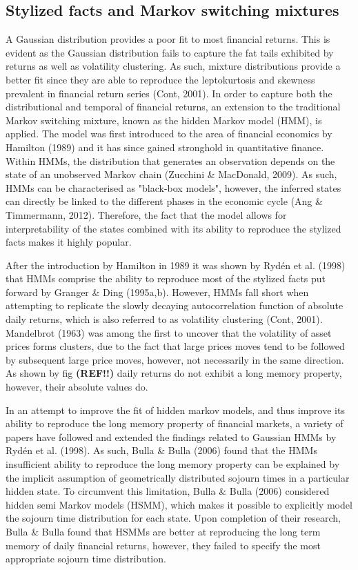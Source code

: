 \subsection*{Stylized facts and Markov switching mixtures}
A Gaussian distribution provides a poor fit to most financial returns. This is evident as the Gaussian distribution fails to capture the fat tails exhibited by returns as well as volatility clustering. As such, mixture distributions provide a better fit since they are able to reproduce the leptokurtosis and skewness prevalent in financial return series (Cont, 2001). In order to capture both the distributional and temporal of financial returns, an extension to the traditional Markov switching mixture, known as the hidden Markov model (HMM), is applied. The model was first introduced to the area of financial economics by Hamilton (1989) and it has since gained stronghold in quantitative finance. Within HMMs, the distribution that generates an observation depends on the state of an unobserved Markov chain (Zucchini \& MacDonald, 2009). As such, HMMs can be characterised as "black-box models", however, the inferred states can directly be linked to the different phases in the economic cycle (Ang \& Timmermann, 2012). Therefore, the fact that the model allows for interpretability of the states combined with its ability to reproduce the stylized facts makes it highly popular. 

After the introduction by Hamilton in 1989 it was shown by Rydén et al. (1998) that HMMs comprise the ability to reproduce most of the stylized facts put forward by Granger \& Ding (1995a,b). However, HMMs fall short when attempting to replicate the slowly decaying autocorrelation function of absolute daily returns, which is also referred to as volatility clustering (Cont, 2001). Mandelbrot (1963) was among the first to uncover that the volatility of asset prices forms clusters, due to the fact that large prices moves tend to be followed by subsequent large price moves, however, not necessarily in the same direction. As shown by fig \textbf{(REF!!)} daily returns do not exhibit a long memory property, however, their absolute values do. 


In an attempt to improve the fit of hidden markov models, and thus improve its ability to reproduce the long memory property of financial markets, a variety of papers have followed and extended the findings related to Gaussian HMMs by Rydén et al. (1998). As such, Bulla \& Bulla (2006) found that the HMMs insufficient ability to reproduce the long memory property can be explained by the implicit assumption of geometrically distributed sojourn times in a particular hidden state. To circumvent this limitation, Bulla \& Bulla (2006) considered hidden semi Markov models (HSMM), which makes it possible to explicitly model the sojourn time distribution for each state. Upon completion of their research, Bulla \& Bulla found that HSMMs are better at reproducing the long term memory of daily financial returns, however, they failed to specify the most appropriate sojourn time distribution. 

